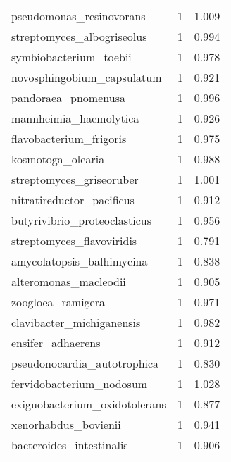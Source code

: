\begin{tabular}{lrr}
                    pseudomonas\_resinovorans &                   1 &     1.009 \\
                  streptomyces\_albogriseolus &                   1 &     0.994 \\
                      symbiobacterium\_toebii &                   1 &     0.978 \\
                  novosphingobium\_capsulatum &                   1 &     0.921 \\
                         pandoraea\_pnomenusa &                   1 &     0.996 \\
                      mannheimia\_haemolytica &                   1 &     0.926 \\
                     flavobacterium\_frigoris &                   1 &     0.975 \\
                           kosmotoga\_olearia &                   1 &     0.988 \\
                    streptomyces\_griseoruber &                   1 &     1.001 \\
                   nitratireductor\_pacificus &                   1 &     0.912 \\
                butyrivibrio\_proteoclasticus &                   1 &     0.956 \\
                   streptomyces\_flavoviridis &                   1 &     0.791 \\
                   amycolatopsis\_balhimycina &                   1 &     0.838 \\
                       alteromonas\_macleodii &                   1 &     0.905 \\
                           zoogloea\_ramigera &                   1 &     0.971 \\
                   clavibacter\_michiganensis &                   1 &     0.982 \\
                           ensifer\_adhaerens &                   1 &     0.912 \\
                 pseudonocardia\_autotrophica &                   1 &     0.830 \\
                    fervidobacterium\_nodosum &                   1 &     1.028 \\
               exiguobacterium\_oxidotolerans &                   1 &     0.877 \\
                        xenorhabdus\_bovienii &                   1 &     0.941 \\
                    bacteroides\_intestinalis &                   1 &     0.906 \\

\end{tabular}
